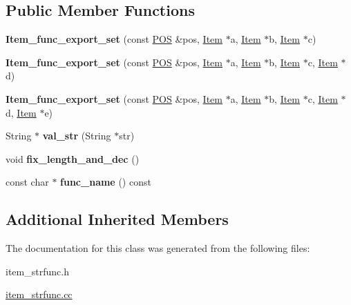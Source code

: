 \subsection*{Public Member Functions}
\begin{DoxyCompactItemize}
\item 
\mbox{\label{classItem__func__export__set_a3adac944e28955910b1f4f148df09f1d}} 
{\bfseries Item\+\_\+func\+\_\+export\+\_\+set} (const \mbox{\hyperlink{structYYLTYPE}{P\+OS}} \&pos, \mbox{\hyperlink{classItem}{Item}} $\ast$a, \mbox{\hyperlink{classItem}{Item}} $\ast$b, \mbox{\hyperlink{classItem}{Item}} $\ast$c)
\item 
\mbox{\label{classItem__func__export__set_a5ddc6b42e7f0e50addfb556de7dd38df}} 
{\bfseries Item\+\_\+func\+\_\+export\+\_\+set} (const \mbox{\hyperlink{structYYLTYPE}{P\+OS}} \&pos, \mbox{\hyperlink{classItem}{Item}} $\ast$a, \mbox{\hyperlink{classItem}{Item}} $\ast$b, \mbox{\hyperlink{classItem}{Item}} $\ast$c, \mbox{\hyperlink{classItem}{Item}} $\ast$d)
\item 
\mbox{\label{classItem__func__export__set_a556b6fb2b699ff6625d9db6545e23b18}} 
{\bfseries Item\+\_\+func\+\_\+export\+\_\+set} (const \mbox{\hyperlink{structYYLTYPE}{P\+OS}} \&pos, \mbox{\hyperlink{classItem}{Item}} $\ast$a, \mbox{\hyperlink{classItem}{Item}} $\ast$b, \mbox{\hyperlink{classItem}{Item}} $\ast$c, \mbox{\hyperlink{classItem}{Item}} $\ast$d, \mbox{\hyperlink{classItem}{Item}} $\ast$e)
\item 
\mbox{\label{classItem__func__export__set_a42d6c1016b153194ed231e4da394fe94}} 
String $\ast$ {\bfseries val\+\_\+str} (String $\ast$str)
\item 
\mbox{\label{classItem__func__export__set_a7160cfd910336ad14d212ff054ae2771}} 
void {\bfseries fix\+\_\+length\+\_\+and\+\_\+dec} ()
\item 
\mbox{\label{classItem__func__export__set_ad9f2c1bd7c9bb56289df4c3794556ab5}} 
const char $\ast$ {\bfseries func\+\_\+name} () const
\end{DoxyCompactItemize}
\subsection*{Additional Inherited Members}


The documentation for this class was generated from the following files\+:\begin{DoxyCompactItemize}
\item 
item\+\_\+strfunc.\+h\item 
\mbox{\hyperlink{item__strfunc_8cc}{item\+\_\+strfunc.\+cc}}\end{DoxyCompactItemize}
